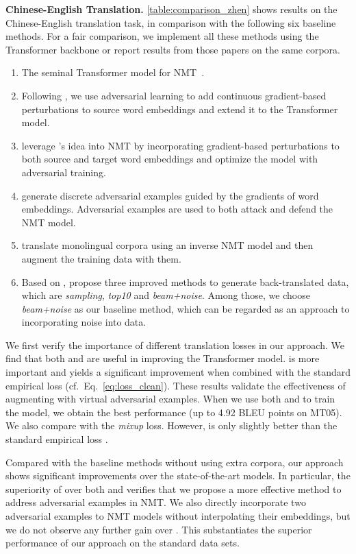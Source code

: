 \documentclass[11pt,a4paper]{article}
\newcommand{\mixup}{\textit{mixup}\xspace}
\begin{document}
\textbf{Chinese-English Translation.}
\autoref{table:comparison_zhen} shows results on the Chinese-English translation task, in comparison with the following six baseline methods. For a fair comparison, we implement all these methods using the Transformer backbone or report results from those papers on the same corpora.
\begin{enumerate}[itemsep=0pt,parsep=0pt,leftmargin=3ex]
\item The seminal Transformer model for NMT~\cite{Vaswani:17}. 
\item Following \citet{Miyato:17}, we use adversarial learning to add continuous gradient-based perturbations to source word embeddings and extend it to the Transformer model.
\item \citet{Sano:19} leverage \citet{Miyato:17}'s idea into NMT by incorporating gradient-based perturbations to both source and target word embeddings and optimize the model with adversarial training. \item \citet{Cheng:19} generate discrete adversarial examples guided by the gradients of word embeddings. Adversarial examples are used to both attack and defend the NMT model.
\item \citet{Sennrich:16b} translate monolingual corpora using an inverse NMT model and then augment the training data with them.
\item Based on \citet{Sennrich:16b}, \citet{Edunov:18} propose three improved methods to generate back-translated data, which are {\em sampling}, {\em top10} and {\em beam+noise}. Among those, we choose {\em beam+noise} as our baseline method, which can be regarded as an approach to incorporating noise into data.
\end{enumerate}

We first verify the importance of different translation losses in our approach.
We find that both  and  are useful in improving the Transformer model.  is more important and yields a significant improvement when combined with the standard empirical loss  (cf.~Eq.~\eqref{eq:loss_clean}). These results validate the effectiveness of augmenting with virtual adversarial examples. When we use both  and  to train the model, we obtain the best performance (up to 4.92 BLEU points on MT05). We also compare with the \mixup loss. However,  is only slightly better than the standard empirical loss .

Compared with the baseline methods without using extra corpora, our approach shows significant improvements over the state-of-the-art models. In particular, the superiority of  over both \citet{Cheng:19} and \citet{Sano:19} verifies that we propose a more effective method to address adversarial examples in NMT. We also directly incorporate two adversarial examples to NMT models without interpolating their embeddings, but we do not observe any further gain over \citet{Cheng:19}. This substantiates the superior performance of our approach on the standard data sets.
\end{document}
